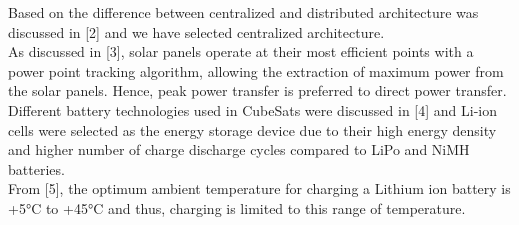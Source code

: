 Based on the difference between centralized and distributed architecture was discussed in [2] and we have selected centralized architecture.
\\

As discussed in [3], solar panels operate at their most efficient points with a power point tracking algorithm, allowing the extraction of maximum power from the solar panels. Hence, peak power transfer is preferred to direct power transfer.
\\

Different battery technologies used in CubeSats were discussed in [4] and Li-ion cells were selected as the energy storage device due to their high energy density and higher number of charge discharge cycles compared to LiPo and NiMH batteries.
\\

From [5], the optimum ambient temperature for charging a Lithium ion battery is +5°C to +45°C and thus, charging is limited to this range of temperature.